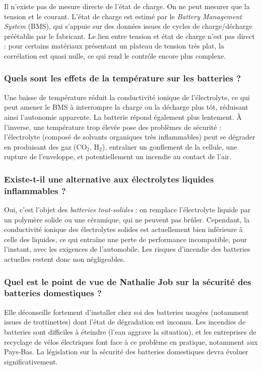 Il n'existe pas de mesure directe de l'état de charge. On ne peut mesurer que la tension et le courant. L'état de charge est estimé par le \textit{Battery Management System} (BMS), qui s'appuie sur des données issues de cycles de charge/décharge préétablis par le fabricant. Le lien entre tension et état de charge n'est pas direct : pour certains matériaux présentant un plateau de tension très plat, la corrélation est quasi nulle, ce qui rend le contrôle encore plus complexe.

\subsubsection{Quels sont les effets de la température sur les batteries ?}

Une baisse de température réduit la conductivité ionique de l'électrolyte, ce qui peut amener le BMS à interrompre la charge ou la décharge plus tôt, réduisant ainsi l'autonomie apparente. La batterie répond également plus lentement. À l'inverse, une température trop élevée pose des problèmes de sécurité : l'électrolyte (composé de solvants organiques très inflammables) peut se dégrader en produisant des gaz (CO$_2$, H$_2$), entraîner un gonflement de la cellule, une rupture de l'enveloppe, et potentiellement un incendie au contact de l'air.

\subsubsection{Existe-t-il une alternative aux électrolytes liquides inflammables ?}

Oui, c'est l'objet des \textit{batteries tout-solides} : on remplace l'électrolyte liquide par un polymère solide ou une céramique, qui ne peuvent pas brûler. Cependant, la conductivité ionique des électrolytes solides est actuellement bien inférieure à celle des liquides, ce qui entraîne une perte de performance incompatible, pour l'instant, avec les exigences de l'automobile. Les risques d'incendie des batteries actuelles restent donc non négligeables.

\subsubsection{Quel est le point de vue de Nathalie Job sur la sécurité des batteries domestiques ?}

Elle déconseille fortement d'installer chez soi des batteries usagées (notamment issues de trottinettes) dont l'état de dégradation est inconnu. Les incendies de batteries sont difficiles à éteindre (l'eau aggrave la situation), et les entreprises de recyclage de vélos électriques font face à ce problème en pratique, notamment aux Pays-Bas. La législation sur la sécurité des batteries domestiques devra évoluer significativement.

